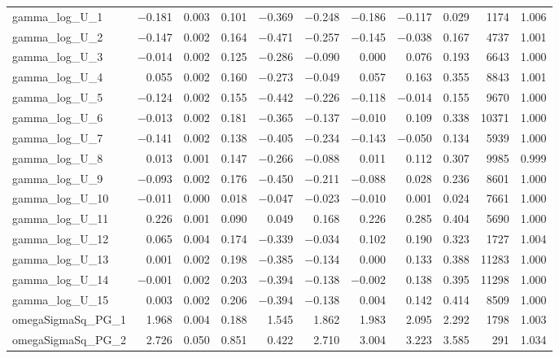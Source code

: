 \documentclass[12pt]{article}
\begin{document}
\begin{longtable}{lrrrrrrrrrr}
gamma\_log\_U\_1  & $-$0.181 & 0.003 & 0.101 & $-$0.369 & $-$0.248 & $-$0.186 & $-$0.117 &  0.029 &  1174 & 1.006 \\
gamma\_log\_U\_2  & $-$0.147 & 0.002 & 0.164 & $-$0.471 & $-$0.257 & $-$0.145 & $-$0.038 &  0.167 &  4737 & 1.001 \\
gamma\_log\_U\_3  & $-$0.014 & 0.002 & 0.125 & $-$0.286 & $-$0.090 &  0.000 &  0.076 &  0.193 &  6643 & 1.000 \\
gamma\_log\_U\_4  &  0.055 & 0.002 & 0.160 & $-$0.273 & $-$0.049 &  0.057 &  0.163 &  0.355 &  8843 & 1.001 \\
gamma\_log\_U\_5  & $-$0.124 & 0.002 & 0.155 & $-$0.442 & $-$0.226 & $-$0.118 & $-$0.014 &  0.155 &  9670 & 1.000 \\
gamma\_log\_U\_6  & $-$0.013 & 0.002 & 0.181 & $-$0.365 & $-$0.137 & $-$0.010 &  0.109 &  0.338 & 10371 & 1.000 \\
gamma\_log\_U\_7  & $-$0.141 & 0.002 & 0.138 & $-$0.405 & $-$0.234 & $-$0.143 & $-$0.050 &  0.134 &  5939 & 1.000 \\
gamma\_log\_U\_8  &  0.013 & 0.001 & 0.147 & $-$0.266 & $-$0.088 &  0.011 &  0.112 &  0.307 &  9985 & 0.999 \\
gamma\_log\_U\_9  & $-$0.093 & 0.002 & 0.176 & $-$0.450 & $-$0.211 & $-$0.088 &  0.028 &  0.236 &  8601 & 1.000 \\
gamma\_log\_U\_10 & $-$0.011 & 0.000 & 0.018 & $-$0.047 & $-$0.023 & $-$0.010 &  0.001 &  0.024 &  7661 & 1.000 \\
gamma\_log\_U\_11 &  0.226 & 0.001 & 0.090 &  0.049 &  0.168 &  0.226 &  0.285 &  0.404 &  5690 & 1.000 \\
gamma\_log\_U\_12 &  0.065 & 0.004 & 0.174 & $-$0.339 & $-$0.034 &  0.102 &  0.190 &  0.323 &  1727 & 1.004 \\
gamma\_log\_U\_13 &  0.001 & 0.002 & 0.198 & $-$0.385 & $-$0.134 &  0.000 &  0.133 &  0.388 & 11283 & 1.000 \\
gamma\_log\_U\_14 & $-$0.001 & 0.002 & 0.203 & $-$0.394 & $-$0.138 & $-$0.002 &  0.138 &  0.395 & 11298 & 1.000 \\
gamma\_log\_U\_15 &  0.003 & 0.002 & 0.206 & $-$0.394 & $-$0.138 &  0.004 &  0.142 &  0.414 &  8509 & 1.000 \\
\addlinespace
omegaSigmaSq\_PG\_1   & 1.968 & 0.004 & 0.188 & 1.545 & 1.862 & 1.983 & 2.095 & 2.292 &  1798 & 1.003 \\
omegaSigmaSq\_PG\_2   & 2.726 & 0.050 & 0.851 & 0.422 & 2.710 & 3.004 & 3.223 & 3.585 &   291 & 1.034 \\

\end{longtable}
\end{document}
